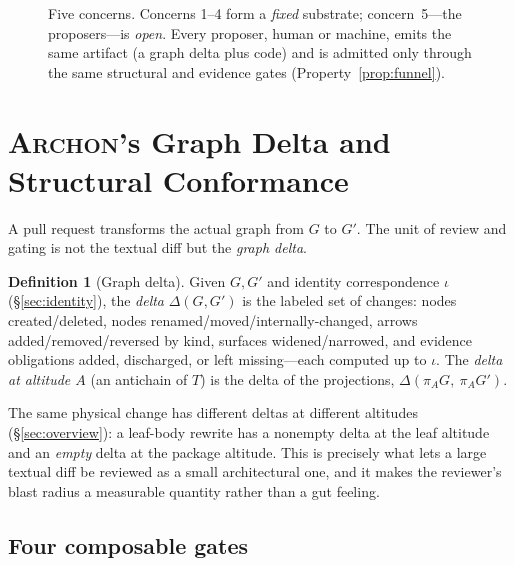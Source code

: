 \documentclass[sigconf,review,anonymous]{acmart}
\theoremstyle{plain}
\theoremstyle{definition}
\newtheorem{definition}[theorem]{Definition}
\begin{document}
\begin{figure}[t]
\centering

\caption{Five concerns. Concerns 1--4 form a \emph{fixed} substrate;
concern~5---the proposers---is \emph{open}. Every proposer, human or machine,
emits the same artifact (a graph delta plus code) and is admitted only through
the same structural and evidence gates (Property~\ref{prop:funnel}).}
\label{fig:substrate}
\end{figure}

\section{\textsc{Archon}'s Graph Delta and Structural Conformance}\label{sec:enforce}

A pull request transforms the actual graph from $G$ to $G'$. The unit of
review and gating is not the textual diff but the \emph{graph delta}.

\begin{definition}[Graph delta]\label{def:delta}
Given $G,G'$ and identity correspondence $\iota$ (\S\ref{sec:identity}), the
\emph{delta} $\Delta(G,G')$ is the labeled set of changes:
nodes created/deleted, nodes renamed/moved/internally-changed, arrows
added/removed/reversed by kind, surfaces widened/narrowed, and evidence
obligations added, discharged, or left missing---each computed up to $\iota$.
The \emph{delta at altitude $A$} (an antichain of $T$) is the delta of the
projections, $\Delta(\pi_A G,\ \pi_A G')$.
\end{definition}

The same physical change has different deltas at different altitudes
(\S\ref{sec:overview}): a leaf-body rewrite has a nonempty delta at the leaf
altitude and an \emph{empty} delta at the package altitude. This is precisely
what lets a large textual diff be reviewed as a small architectural one, and it
makes the reviewer's blast radius a measurable quantity rather than a
gut feeling.

\subsection{Four composable gates}
\end{document}
